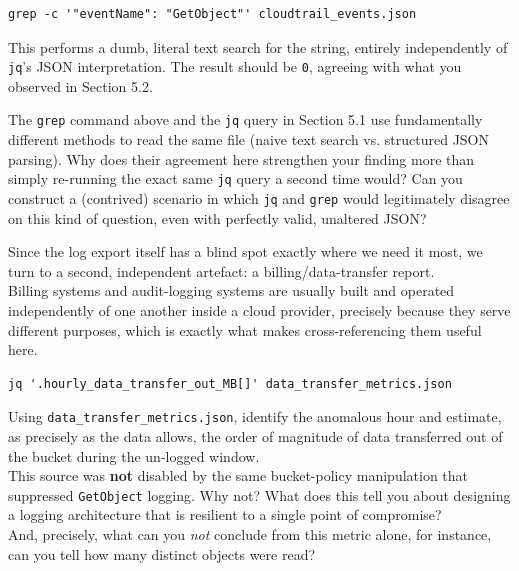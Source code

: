 \begin{lstlisting}
grep -c '"eventName": "GetObject"' cloudtrail_events.json
\end{lstlisting}
This performs a dumb, literal text search for the string, entirely independently of \texttt{jq}'s
JSON interpretation. The result should be \texttt{0}, agreeing with what you observed in Section
5.2.

\begin{questionbox}
The \texttt{grep} command above and the \texttt{jq} query in Section 5.1 use fundamentally
different methods to read the same file (naive text search vs. structured JSON parsing). Why
does their agreement here strengthen your finding more than simply re-running the exact same
\texttt{jq} query a second time would? Can you construct a (contrived) scenario in which
\texttt{jq} and \texttt{grep} would legitimately disagree on this kind of question, even with
perfectly valid, unaltered JSON?
\end{questionbox}

\begin{answerbox}
\vspace{3cm}
\end{answerbox}

\noindent
Since the log export itself has a blind spot exactly where we need it most, we turn to a second, independent artefact: a billing/data-transfer report.\\
Billing systems and audit-logging systems are usually built and operated independently of one another inside a cloud provider, precisely
because they serve different purposes, which is exactly what makes cross-referencing them useful here.

\begin{lstlisting}
jq '.hourly_data_transfer_out_MB[]' data_transfer_metrics.json
\end{lstlisting}

\begin{questionbox}
Using \texttt{data\_transfer\_metrics.json}, identify the anomalous hour and estimate, as precisely as the data allows, the order of magnitude of data transferred out of the bucket during the un-logged window. \\
This source was \textbf{not} disabled by the same bucket-policy manipulation that suppressed \texttt{GetObject} logging. Why not? What does this tell you about designing a logging architecture that is resilient to a single point of compromise? \\
And, precisely, what can you \emph{not} conclude from this metric alone, for instance, can you tell how many distinct objects were read?
\end{questionbox}

